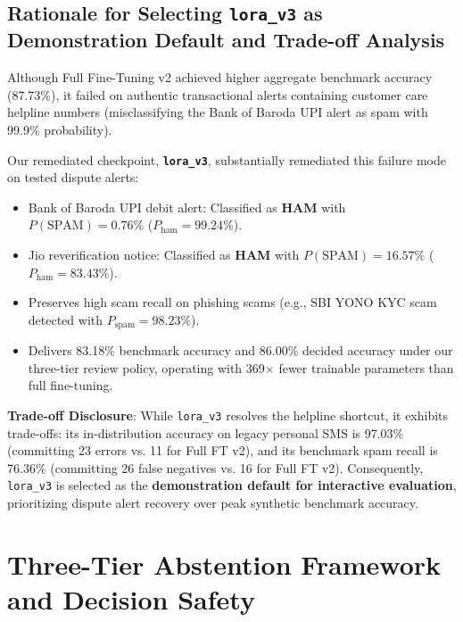 \documentclass[conference]{IEEEtran}
\begin{document}
\subsection{Rationale for Selecting \texttt{lora\_v3} as Demonstration Default and Trade-off Analysis}
Although Full Fine-Tuning v2 achieved higher aggregate benchmark accuracy (87.73\%), it failed on authentic transactional alerts containing customer care helpline numbers (misclassifying the Bank of Baroda UPI alert as spam with 99.9\% probability).

Our remediated checkpoint, \textbf{\texttt{lora\_v3}}, substantially remediated this failure mode on tested dispute alerts:
\begin{itemize}
    \item Bank of Baroda UPI debit alert: Classified as \textbf{HAM} with $P(\text{SPAM}) = 0.76\%$ ($P_{\text{ham}} = 99.24\%$).
    \item Jio reverification notice: Classified as \textbf{HAM} with $P(\text{SPAM}) = 16.57\%$ ($P_{\text{ham}} = 83.43\%$).
    \item Preserves high scam recall on phishing scams (e.g., SBI YONO KYC scam detected with $P_{\text{spam}} = 98.23\%$).
    \item Delivers 83.18\% benchmark accuracy and 86.00\% decided accuracy under our three-tier review policy, operating with 369$\times$ fewer trainable parameters than full fine-tuning.
\end{itemize}

\textbf{Trade-off Disclosure}: While \texttt{lora\_v3} resolves the helpline shortcut, it exhibits trade-offs: its in-distribution accuracy on legacy personal SMS is 97.03\% (committing 23 errors vs. 11 for Full FT v2), and its benchmark spam recall is 76.36\% (committing 26 false negatives vs. 16 for Full FT v2). Consequently, \texttt{lora\_v3} is selected as the \textbf{demonstration default for interactive evaluation}, prioritizing dispute alert recovery over peak synthetic benchmark accuracy.

\section{Three-Tier Abstention Framework and Decision Safety}
\label{sec:abstention}
\end{document}
